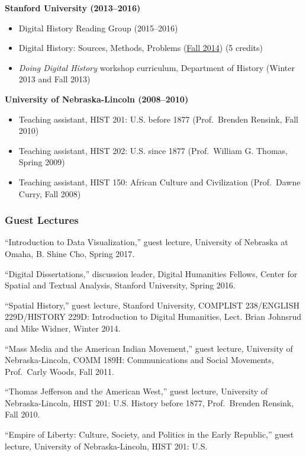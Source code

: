\textbf{Stanford University (2013--2016)}

\begin{itemize}
\tightlist
\item
  Digital History Reading Group (2015--2016)
\item
  Digital History: Sources, Methods, Problems
  (\href{http://jasonheppler.org/teaching/hist205f.2014/}{Fall 2014}) (5
  credits)
\item
  \emph{Doing Digital History} workshop curriculum, Department of
  History (Winter 2013 and Fall 2013)
\end{itemize}

\textbf{University of Nebraska-Lincoln (2008--2010)}

\begin{itemize}
\tightlist
\item
  Teaching assistant, HIST 201: U.S. before 1877 (Prof.~Brenden Rensink,
  Fall 2010)
\item
  Teaching assistant, HIST 202: U.S. since 1877 (Prof.~William G.
  Thomas, Spring 2009)
\item
  Teaching assistant, HIST 150: African Culture and Civilization
  (Prof.~Dawne Curry, Fall 2008)
\end{itemize}

\subsubsection{Guest Lectures}\label{guest-lectures}

``Introduction to Data Visualization,'' guest lecture, University of
Nebraska at Omaha, B. Shine Cho, Spring 2017.

``Digital Dissertations,'' discussion leader, Digital Humanities
Fellows, Center for Spatial and Textual Analysis, Stanford University,
Spring 2016.

``Spatial History,'' guest lecture, Stanford University, COMPLIST
238/ENGLISH 229D/HISTORY 229D: Introduction to Digital Humanities, Lect.
Brian Johnsrud and Mike Widner, Winter 2014.

``Mass Media and the American Indian Movement,'' guest lecture,
University of Nebraska-Lincoln, COMM 189H: Communications and Social
Movements, Prof.~Carly Woods, Fall 2011.

``Thomas Jefferson and the American West,'' guest lecture, University of
Nebraska-Lincoln, HIST 201: U.S. History before 1877, Prof.~Brenden
Rensink, Fall 2010.

``Empire of Liberty: Culture, Society, and Politics in the Early
Republic,'' guest lecture, University of Nebraska-Lincoln, HIST 201:
U.S.

